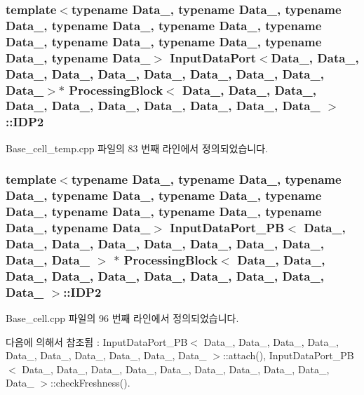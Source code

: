 \subsubsection[{\texorpdfstring{I\+D\+P2}{IDP2}}]{\setlength{\rightskip}{0pt plus 5cm}template$<$typename Data\+\_, typename Data\+\_, typename Data\+\_, typename Data\+\_, typename Data\+\_, typename Data\+\_, typename Data\+\_, typename Data\+\_, typename Data\+\_, typename Data\+\_$>$ {\bf Input\+Data\+Port}$<$Data\+\_, Data\+\_, Data\+\_, Data\+\_, Data\+\_, Data\+\_, Data\+\_, Data\+\_, Data\+\_, Data\+\_$>$$\ast$ {\bf Processing\+Block}$<$ Data\+\_, Data\+\_, Data\+\_, Data\+\_, Data\+\_, Data\+\_, Data\+\_, Data\+\_, Data\+\_, Data\+\_ $>$\+::I\+D\+P2}\hypertarget{classProcessingBlock_aeb1490363515b921c207ff9197f3e46f}{}\label{classProcessingBlock_aeb1490363515b921c207ff9197f3e46f}


Base\+\_\+cell\+\_\+temp.\+cpp 파일의 83 번째 라인에서 정의되었습니다.

\subsubsection[{\texorpdfstring{I\+D\+P2}{IDP2}}]{\setlength{\rightskip}{0pt plus 5cm}template$<$typename Data\+\_, typename Data\+\_, typename Data\+\_, typename Data\+\_, typename Data\+\_, typename Data\+\_, typename Data\+\_, typename Data\+\_, typename Data\+\_, typename Data\+\_$>$ {\bf Input\+Data\+Port\+\_\+\+PB}$<$ Data\+\_, Data\+\_, Data\+\_, Data\+\_, Data\+\_, Data\+\_, Data\+\_, Data\+\_, Data\+\_, Data\+\_ $>$ $\ast$ {\bf Processing\+Block}$<$ Data\+\_, Data\+\_, Data\+\_, Data\+\_, Data\+\_, Data\+\_, Data\+\_, Data\+\_, Data\+\_, Data\+\_ $>$\+::I\+D\+P2}\hypertarget{classProcessingBlock_a70761edd03bbbf4541c61b6579cae2c0}{}\label{classProcessingBlock_a70761edd03bbbf4541c61b6579cae2c0}


Base\+\_\+cell.\+cpp 파일의 96 번째 라인에서 정의되었습니다.



다음에 의해서 참조됨 \+:  Input\+Data\+Port\+\_\+\+P\+B$<$ Data\+\_, Data\+\_, Data\+\_, Data\+\_, Data\+\_, Data\+\_, Data\+\_, Data\+\_, Data\+\_, Data\+\_ $>$\+::attach(), Input\+Data\+Port\+\_\+\+P\+B$<$ Data\+\_, Data\+\_, Data\+\_, Data\+\_, Data\+\_, Data\+\_, Data\+\_, Data\+\_, Data\+\_, Data\+\_ $>$\+::check\+Freshness().

